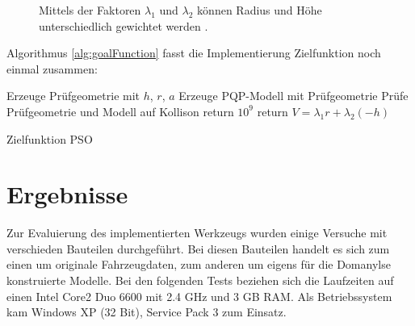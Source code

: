 \begin{figure}[ht]
    \centering 
\caption{Mittels der Faktoren $\lambda_{1}$ und $\lambda_{2}$ k\"onnen Radius und H\"ohe unterschiedlich gewichtet werden .} 
\label{im:domes}
\end{figure} 

Algorithmus \ref{alg:goalFunction} fasst die Implementierung Zielfunktion  noch einmal zusammen:

\begin{algorithm}[H]
 \SetLine %
 Erzeuge Pr\"ufgeometrie mit ${h}$, ${r}$, ${a}$\;
 Erzeuge PQP-Modell mit Pr\"ufgeometrie\;
 Pr\"ufe  Pr\"ufgeometrie und Modell auf Kollison\;
 {
      return $10^9$\;
 }
 return ${V=\lambda_{1}{r} + \lambda_{2}({-h})}$
 \caption{Zielfunktion PSO}
 \label{alg:goalFunction}
\end{algorithm}


\section{Ergebnisse}
\label{resultsPSO}

Zur Evaluierung des implementierten Werkzeugs wurden einige Versuche mit verschieden Bauteilen durchgef\"uhrt.
Bei diesen Bauteilen handelt es sich zum einen um originale Fahrzeugdaten, zum anderen um eigens f\"ur die Domanylse konstruierte Modelle. Bei den folgenden Tests beziehen sich die Laufzeiten auf einen Intel Core2 Duo 6600 mit 2.4 GHz und 3 GB RAM. Als
Betriebssystem kam Windows XP (32 Bit), Service Pack 3 zum Einsatz.

